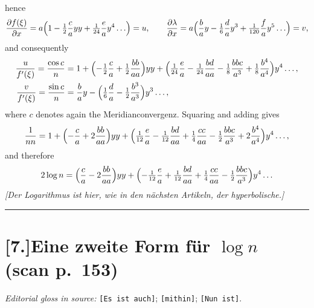 \documentclass[12pt,a4paper]{article}
\begin{document}
hence
\[
   \frac{\partial f(\xi)}{\partial x}
     =a\Bigl(1-\tfrac{1}{2}\frac{c}{a}yy+\tfrac{1}{24}\frac{e}{a}y^{4}\ldots\Bigr)=u,
   \qquad
   \frac{\partial\lambda}{\partial x}
     =a\Bigl(\frac{b}{a}y-\tfrac{1}{6}\frac{d}{a}y^{3}+\tfrac{1}{120}\frac{f}{a}y^{5}\ldots\Bigr)=v,
\]
and consequently
\begin{align*}
   \frac{u}{f'(\xi)}=\frac{\cos c}{n}
   &=1+\Bigl(-\tfrac{1}{2}\frac{c}{a}+\tfrac{1}{2}\frac{bb}{aa}\Bigr)yy
       +\Bigl(\tfrac{1}{24}\frac{e}{a}-\tfrac{1}{24}\frac{bd}{aa}
                -\tfrac{1}{8}\frac{bbc}{a^{3}}+\tfrac{1}{8}\frac{b^{4}}{a^{4}}\Bigr)y^{4}\ldots,\\
   \frac{v}{f'(\xi)}=\frac{\sin c}{n}
   &=\frac{b}{a}y-\Bigl(\tfrac{1}{6}\frac{d}{a}-\tfrac{1}{2}\frac{b^{3}}{a^{3}}\Bigr)y^{3}\ldots,
\end{align*}
where $c$ denotes again the Meridianconvergenz. Squaring and adding
gives
\[
   \frac{1}{nn}=1+\Bigl(-\frac{c}{a}+2\frac{bb}{aa}\Bigr)yy
       +\Bigl(\tfrac{1}{12}\frac{e}{a}-\tfrac{1}{12}\frac{bd}{aa}
                +\tfrac{1}{4}\frac{cc}{aa}-\tfrac{1}{2}\frac{bbc}{a^{3}}
                +2\frac{b^{4}}{a^{4}}\Bigr)y^{4}\ldots,
\]
and therefore
\[
   2\log n=\Bigl(\frac{c}{a}-2\frac{bb}{aa}\Bigr)yy
       +\Bigl(-\tfrac{1}{12}\frac{e}{a}+\tfrac{1}{12}\frac{bd}{aa}
                +\tfrac{1}{4}\frac{cc}{aa}-\tfrac{1}{2}\frac{bbc}{a^{3}}\Bigr)y^{4}\ldots
\]
\noindent\textit{[Der Logarithmus ist hier, wie in den n\"achsten Artikeln, der hyperbolische.]}

\bigskip
\hrule
\bigskip

\section*{[7.]\quad Eine zweite Form f\"ur $\log n$\\(scan p.~153)}

\textit{Editorial gloss in source:} \texttt{[Es ist auch]}; \texttt{[mithin]};
\texttt{[Nun ist]}.
\end{document}
